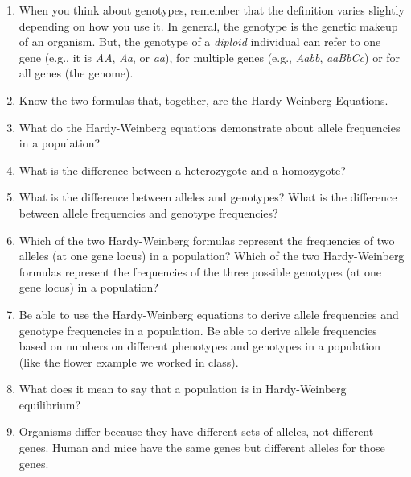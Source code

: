 \documentclass[letterpaper]{tufte-handout}
\begin{document}
\begin{enumerate}

	\item When you think about genotypes, remember that the
	definition varies slightly depending on how you use it. In
	general, the genotype is the genetic makeup of an organism. 
	But, the genotype of a \emph{diploid}%
	individual can refer to one gene (e.g., it is \emph{AA}, 
	\emph{Aa}, or \emph{aa}), for multiple genes (e.g., 
	\emph{Aabb}, \emph{aaBbCc}) or for all genes (the genome).

	\item Know the two formulas that, together, are the Hardy-Weinberg Equations.

	\item What do the Hardy-Weinberg equations demonstrate about allele frequencies in a population?

	\item What is the difference between a heterozygote and a homozygote?

	\item What is the difference between alleles and genotypes?  What is the difference between allele frequencies and genotype frequencies?

	\item Which of the two Hardy-Weinberg formulas represent the frequencies of two alleles (at one gene locus) in a population?  Which of the two Hardy-Weinberg formulas represent the frequencies of the three possible genotypes (at one gene locus) in a population?

	\item Be able to use the Hardy-Weinberg equations to derive allele frequencies and genotype frequencies in a population.  Be able to derive allele frequencies based on numbers on different phenotypes and genotypes in a population (like the flower example we worked in class). 

	\item What does it mean to say that a population is in Hardy-Weinberg equilibrium?

	\item Organisms differ because they have different sets of alleles, not different genes.%
	Human and mice have the same genes but different alleles for 
	those genes.
\end{enumerate}
\end{document}
